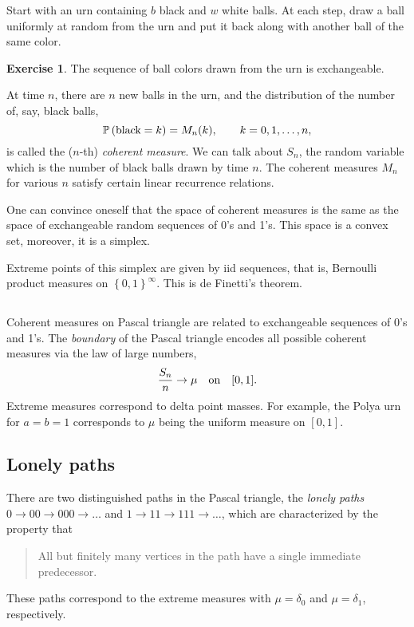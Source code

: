 \documentclass[letterpaper,11pt,oneside,reqno]{article}
\numberwithin{equation}{section}
\theoremstyle{definition}
\newtheorem{exercise}[proposition]{Exercise}
\begin{document}
Start with an urn containing $b$ black and $w$ white balls.
At each step, draw a ball uniformly at random from the urn
and put it back along with another ball of the same color.

\begin{exercise}
	The sequence of ball colors drawn from the urn is exchangeable.
\end{exercise}

At time $n$, there are $n$ new balls in the urn, and the distribution of the number of, say, 
black balls, 
\begin{equation*}
	\operatorname{\mathbb{P}}\left( \textnormal{black}=k \right) = M_n(k),
	\qquad k=0,1,\ldots,n,
\end{equation*}
is called the ($n$-th) \emph{coherent measure}.
We can talk about $S_n$, the random variable which is the number of black balls drawn by time $n$.
The coherent measures $M_n$ for various $n$ satisfy certain linear 
recurrence relations.

One can convince oneself that the space of coherent measures is 
the same as the space of exchangeable random sequences of 0's and 1's.
This space is a convex set, moreover, it is a simplex.

Extreme points of this simplex are given by iid sequences, 
that is, Bernoulli product measures on $\left\{ 0,1 \right\}^\infty$.
This is de Finetti's theorem.

\subsection{}

Coherent measures on Pascal triangle are related to exchangeable
sequences of 0's and 1's. The \emph{boundary} of the Pascal
triangle encodes all possible coherent measures via the law of large numbers,
\begin{equation*}
	\frac{S_n}{n}\to \mu \quad \textnormal{on} \quad [0,1].
\end{equation*}
Extreme measures correspond to delta point masses.
For example, the Polya urn for $a=b=1$ corresponds to $\mu$ being the
uniform measure on $[0,1]$.

\subsection{Lonely paths}

There are two distinguished paths in the Pascal triangle, the 
\emph{lonely paths} $0\to00\to000\to\ldots $
and 
$1\to 11\to111\to\ldots $, which are characterized by the 
property that \cite{KerovGoodman1997}
\begin{quote}
	All but finitely many vertices in the path have a single immediate predecessor.
\end{quote}
These paths correspond to the extreme measures 
with $\mu=\delta_0$ and $\mu=\delta_1$, respectively.
\end{document}
